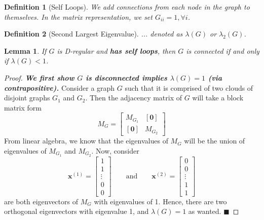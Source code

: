 \documentclass[11pt, letter]{book}
\newcommand{\bx}{\mathbf{x}}
\newcommand{\bzero}{\mathbf{0}}
\newcommand{\qed}{\hfill $\blacksquare$}
\newtheorem{definition}{Definition}[chapter]
\newtheorem{lemma}[theorem]{Lemma}
\begin{document}
\begin{definition}[Self Loops]
	We add connections from each node in the graph to themselves. In the matrix representation, we set $G_{ii} = 1, \forall i$. 
\end{definition}

\begin{definition}[Second Largest Eigenvalue]
	... denoted as $\lambda(G)$ or $\lambda_2(G)$. 
\end{definition}

\begin{lemma}
	If $G$ is D-regular and \textbf{has self loops}, then $G$ is connected if and only if $\lambda(G) < 1$.
\end{lemma}

\begin{proof} \textit{\textbf{We first show $G$ is disconnected implies $\lambda(G) = 1$ (via contrapositive).}} Consider a graph $G$ such that it is comprised of two clouds of disjoint graphs $G_1$ and $G_2$. Then the adjacency matrix of $G$ will take a block matrix form
\begin{equation}
	M_G = \begin{bmatrix}
		M_{G_1} & [\bzero ]  \\
		[\bzero ] & M_{G_2}
	\end{bmatrix}
\end{equation}
From linear algebra, we know that the eigenvalues of $M_G$ will be the union of eigenvalues of $M_{G_1}$ and $M_{G_2}$. Now, consider
\begin{equation}
	\bx^{(1)} = 
	\begin{bmatrix}
		1 \\ 1 \\ \vdots \\ 0 \\ 0
	\end{bmatrix} 
	\quad \quad \text{and} \quad \quad
	\bx^{(2)} = 
	\begin{bmatrix}
		0 \\ 0 \\ \vdots \\ 1 \\ 1
	\end{bmatrix}
\end{equation}
are both eigenvectors of $M_G$ with eigenvalues of 1. Hence, there are two orthogonal eigenvectors with eigenvalue 1, and $\lambda(G) = 1$ as wanted. 
\qed


\end{proof}
\end{document}
